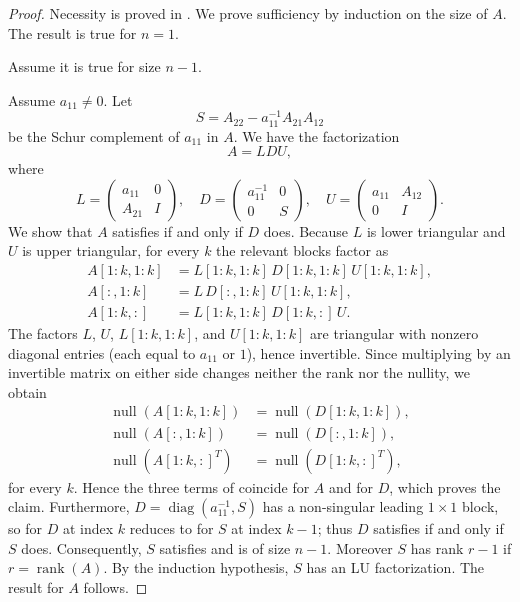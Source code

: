 \documentclass[10pt,twoside]{siamart1116}
\DeclareMathOperator{\rk}{rank}
\DeclareMathOperator{\nl}{null}
\numberwithin{theorem}{section}
\begin{document}
\begin{proof}
  Necessity is proved in . We prove sufficiency by induction on the size of $A$. The result is true for $n=1$.

  Assume it is true for size $n-1$.

  Assume $a_{11} \neq 0$. Let
  \[
    S = A_{22} - a_{11}^{-1} A_{21} A_{12}
  \]
  be the Schur complement of $a_{11}$ in $A$. We have the factorization
  \[
    A = LDU,
  \]
  where
  \[
    L =
    \begin{pmatrix}
      a_{11} & 0 \\
      A_{21} & I
    \end{pmatrix}, \quad
    D =
    \begin{pmatrix}
      a_{11}^{-1} & 0 \\
      0           & S
    \end{pmatrix}, \quad
    U =
    \begin{pmatrix}
      a_{11} & A_{12} \\
      0      & I
    \end{pmatrix}.
  \]
  We show that $A$ satisfies  if and only if $D$ does. Because $L$ is lower triangular and $U$ is upper triangular, for every $k$ the relevant blocks factor as
  \begin{align*}
    A[1:k,1:k] & = L[1:k,1:k]\, D[1:k,1:k]\, U[1:k,1:k], \\
    A[:,1:k]   & = L\, D[:,1:k]\, U[1:k,1:k],            \\
    A[1:k,:]   & = L[1:k,1:k]\, D[1:k,:]\, U.
  \end{align*}
  The factors $L$, $U$, $L[1:k,1:k]$, and $U[1:k,1:k]$ are triangular with nonzero diagonal entries (each equal to $a_{11}$ or $1$), hence invertible. Since multiplying by an invertible matrix on either side changes neither the rank nor the nullity, we obtain
  \begin{align*}
    \nl(A[1:k,1:k])   & = \nl(D[1:k,1:k]),  \\
    \nl(A[:,1:k])     & = \nl(D[:,1:k]),     \\
    \nl({A[1:k,:]}^T) & = \nl({D[1:k,:]}^T),
  \end{align*}
  for every $k$. Hence the three terms of  coincide for $A$ and for $D$, which proves the claim. Furthermore, $D = \operatorname{diag}(a_{11}^{-1}, S)$ has a non-singular leading $1 \times 1$ block, so  for $D$ at index $k$ reduces to  for $S$ at index $k-1$; thus $D$ satisfies  if and only if $S$ does. Consequently, $S$ satisfies  and is of size $n-1$. Moreover $S$ has rank $r-1$ if $r = \rk(A)$. By the induction hypothesis, $S$ has an LU factorization. The result for $A$ follows.


\end{proof}
\end{document}

